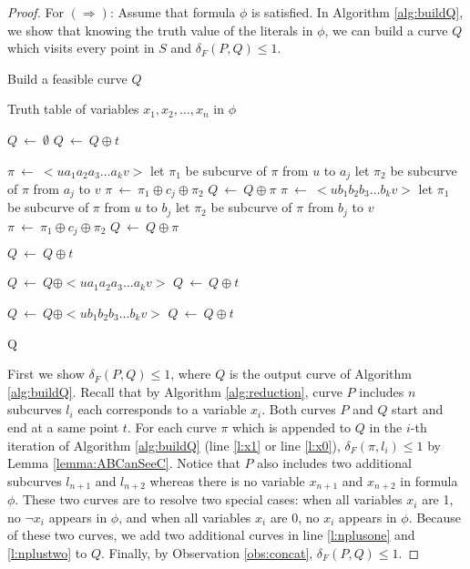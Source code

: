 \documentclass[a4paper,UKenglish]{lipics}
\newcommand{\eq}{{\ \leftarrow\ }}
\newcommand{\CS}{{\mathscr S}}
\newcommand{\CQ}{{\mathscr Q}}
\newcommand{\cfev}{{l}} \newcommand{\sq}{{\CS\CQ}}
\newcommand{\distF}{\delta_F}
\newcommand{\ap}{\oplus}
\newcommand{\pset}{S}
\begin{document}
\begin{proof}


For $(\Rightarrow)$: 
Assume that  formula $\phi$ is satisfied. 
In Algorithm \ref{alg:buildQ}, we show that 
knowing the truth value of the literals in $\phi$, 
we can build a curve $Q$ which 
visits every point in $\pset$ and $\distF(P,Q) \le 1$.



\begin{algorithm} [h]
\caption {{\sc Build a feasible curve $Q$ }} 
\label{alg:buildQ}
\begin{algorithmic}[1]	
		\baselineskip
	\REQUIRE  Truth table of variables $x_1, x_2, \dots, x_n$ in $\phi$

	\STATE $Q \eq \emptyset$
	\STATE $Q \eq Q \ap t$ \label{l:startPoint}
	 
	\STATE $\pi \eq <ua_1a_2a_3 \dots a_kv>$
	\STATE let $\pi_1 $ be  subcurve of $\pi$ from $u$	 to $a_j$
	\STATE let $\pi_2 $ be  subcurve of $\pi$ from $a_j$	 to $v$
	\STATE $\pi \eq \pi_1 \ap c_j \ap \pi_2$  \label{l:visitCone}
	\ENDFOR
	\STATE $Q \eq Q \ap \pi$ \label{l:x1}
	\ELSE 	
	\STATE $\pi \eq <ub_1b_2b_3 \dots b_kv>$
	\STATE let $\pi_1 $ be  subcurve of $\pi$ from $u$	 to $b_j$
	\STATE let $\pi_2 $ be  subcurve of $\pi$ from $b_j$	 to $v$
	\STATE $\pi \eq \pi_1 \ap c_j \ap \pi_2$ \label{l:visitCzero}
	\ENDFOR
	\STATE $Q \eq Q \ap \pi$ \label{l:x0}

	\ENDIF
	\STATE $Q \eq Q \ap t$



	\ENDFOR
	\STATE $Q \eq Q \ap <ua_1a_2a_3 \dots a_kv>$\label{l:nplusone}
	\STATE $Q \eq Q \ap t$

	\STATE $Q \eq Q \ap <ub_1b_2b_3 \dots b_kv>$\label{l:nplustwo}
	\STATE $Q \eq Q \ap t$  \label{l:endPoint}

	 {\sc Q}  
\end{algorithmic}
\end{algorithm}






First we show $\distF(P,Q) \le 1$, where $Q$
is the output curve of Algorithm \ref{alg:buildQ}.
Recall that by Algorithm \ref{alg:reduction}, 
curve $P$ includes $n$ subcurves $\cfev_{i}$ each corresponds 
to a variable $x_i$. 
Both 
curves $P$ and $Q$ start and end at a same point $t$.
For each curve $\pi$ which is appended to $Q$ 
in the $i$-th iteration of Algorithm \ref{alg:buildQ} 
(line \ref{l:x1} or line \ref{l:x0}), 
$\distF(\pi,\cfev_i) \le 1$  by Lemma \ref{lemma:ABCanSeeC}. 
Notice that $P$ also includes two additional subcurves $\cfev_{n+1}$ and $\cfev_{n+2}$ whereas there is no variable $x_{n+1}$ and $x_{n+2}$ in formula $\phi$. These two curves are to resolve two special cases: 
when all variables $x_i$ are 1,  no $\neg x_i$ appears in $\phi$,
and when all variables $x_i$ are 0,  no $x_i$ appears in $\phi$.
Because of these two curves, 
we add two additional curves in line \ref{l:nplusone}
and \ref{l:nplustwo} to $Q$. Finally, by  Observation 
\ref{obs:concat}, $\distF(P,Q) \le 1$.


\end{proof}
\end{document}
